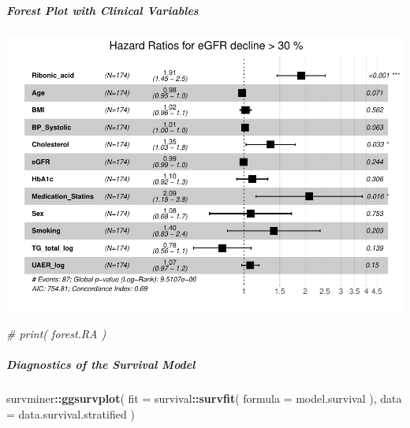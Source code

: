 \documentclass[]{article}
\newenvironment{Shaded}{\begin{snugshade}}{\end{snugshade}}
\newcommand{\CommentTok}[1]{\textcolor[rgb]{0.56,0.35,0.01}{\textit{#1}}}
\newcommand{\DataTypeTok}[1]{\textcolor[rgb]{0.13,0.29,0.53}{#1}}
\newcommand{\KeywordTok}[1]{\textcolor[rgb]{0.13,0.29,0.53}{\textbf{#1}}}
\newcommand{\NormalTok}[1]{#1}
\newcommand{\OperatorTok}[1]{\textcolor[rgb]{0.81,0.36,0.00}{\textbf{#1}}}
\newcommand{\StringTok}[1]{\textcolor[rgb]{0.31,0.60,0.02}{#1}}
\let\oldsubparagraph\subparagraph
\renewcommand{\subparagraph}[1]{\oldsubparagraph{#1}\mbox{}}
\begin{document}
\hypertarget{forest-plot-with-clinical-variables-1}{%
\subparagraph{Forest Plot with Clinical
Variables}\label{forest-plot-with-clinical-variables-1}}

\begin{Shaded}
\end{Shaded}

\includegraphics{0033_PROFIL--Metabolomics_files/figure-latex/RA-Matched-Mortality-Adjusted-Forest-1.pdf}

\begin{Shaded}
\begin{Highlighting}[]
\CommentTok{# print( forest.RA )}
\end{Highlighting}
\end{Shaded}

\newpage

\hypertarget{diagnostics-of-the-survival-model-1}{%
\subparagraph{Diagnostics of the Survival
Model}\label{diagnostics-of-the-survival-model-1}}

\begin{Shaded}
\begin{Highlighting}[]
\NormalTok{survminer}\OperatorTok{::}\KeywordTok{ggsurvplot}\NormalTok{(}
  \DataTypeTok{fit =}\NormalTok{ survival}\OperatorTok{::}\KeywordTok{survfit}\NormalTok{( }\DataTypeTok{formula =}\NormalTok{ model.survival ), }
  \DataTypeTok{data =}\NormalTok{ data.survival.stratified}
\NormalTok{)}
\end{Highlighting}
\end{Shaded}
\end{document}
